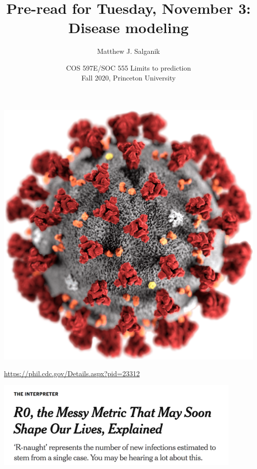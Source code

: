 \documentclass[aspectratio=169]{beamer}
\title[]{Pre-read for Tuesday, November 3:\\Disease modeling}
\author[]{Matthew J. Salganik}
\institute[]{}
\date[]{COS 597E/SOC 555 Limits to prediction\\Fall 2020, Princeton University}
\begin{document}
\frame{\titlepage}
\begin{frame}

\begin{center}
\includegraphics[height = 0.9\textheight]{figures/covid}
\end{center}

\vfill
\tiny{\url{https://phil.cdc.gov/Details.aspx?pid=23312}}
\end{frame}
\begin{frame}

\begin{center}
\includegraphics[width = 0.9\textwidth]{figures/fisher_r0_2020_title}
\end{center}

\end{frame}
\end{document}
